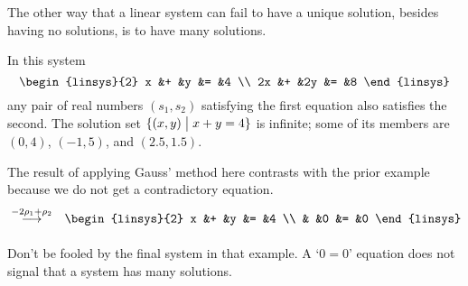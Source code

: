 The other way that 
a linear system can fail to have a unique solution, besides having no solutions,
is to have many solutions.

\begin{example}
In this system
\begin{equation*}
  \begin{linsys}{2}
    x  &+  &y   &=  &4  \\
   2x  &+  &2y  &=  &8  
  \end{linsys}
\end{equation*}
any pair of real numbers $(s_1,s_2)$ satisfying the first equation also
satisfies the second.
The solution set \( \{ (x,y)\bigm| x+y=4 \} \) is infinite; some
of its members are~$(0,4)$, $(-1,5)$, and $(2.5,1.5)$.

The result of applying Gauss' method here contrasts with the prior example
because we do not get a contradictory equation.
\begin{eqnarray*}
  &\grstep{-2\rho_1 + \rho_2}
  &\begin{linsys}{2}
    x  &+  &y   &=  &4  \\
       &   &0   &=  &0  
   \end{linsys}
\end{eqnarray*}
\end{example}

Don't be fooled by the final system in that example.
A `$0=0$' equation does not signal that a system has many solutions.

